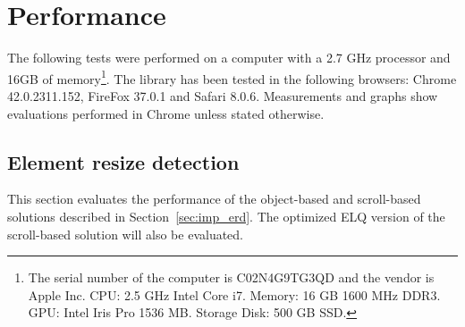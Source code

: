 \documentclass[a4paper,11pt]{kth-mag}
\begin{document}
    \section{Performance}\label{sec:eval-performance}
      The following tests were performed on a computer with a 2.7 GHz processor and 16GB of memory\footnote{The serial number of the computer is C02N4G9TG3QD and the vendor is Apple Inc. CPU: 2.5 GHz Intel Core i7. Memory: 16 GB 1600 MHz DDR3. GPU: Intel Iris Pro 1536 MB. Storage Disk: 500 GB SSD.}.
      The library has been tested in the following browsers: Chrome 42.0.2311.152, FireFox 37.0.1 and Safari 8.0.6.
      Measurements and graphs show evaluations performed in Chrome unless stated otherwise.

      \subsection{Element resize detection}\label{sec:eval-perf-erd}
        This section evaluates the performance of the object-based and scroll-based solutions described in Section~\ref{sec:imp_erd}.
        The optimized \gls{ELQ} version of the scroll-based solution will also be evaluated.
\end{document}
